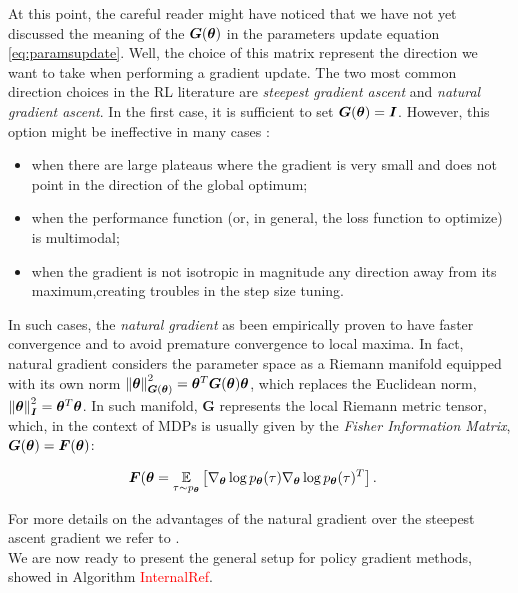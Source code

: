 At this point, the careful reader might have noticed that we have not yet discussed the meaning of the $\boldsymbol{G}(\boldsymbol{\theta})$ in the parameters update equation \ref{eq:paramsupdate}. Well, the choice of this matrix represent the direction we want to take when performing a gradient update. The two most common direction choices in the \gls{RL} literature are \emph{steepest gradient ascent} and \emph{natural gradient ascent}. In the first case, it is sufficient to set $\boldsymbol{G}(\boldsymbol{\theta})=\boldsymbol{I}$. However, this option might be ineffective in many cases \cite{amari1998natural1}:

\begin{itemize}
\item when there are large plateaus where the gradient is very small and does not point in the direction of the global optimum;
\item when the performance function (or, in general, the loss function to optimize) is multimodal;
\item when the gradient is not isotropic in magnitude \wrt any direction away from its maximum,creating troubles in the step size tuning.
\end{itemize}

In such cases, the \emph{natural gradient} as been empirically proven to have faster convergence and to avoid premature convergence to local maxima. In fact, natural gradient considers the parameter space as a Riemann manifold equipped with its own norm $\left\lVert\boldsymbol{\theta}\right\rVert^2_{\boldsymbol{G}(\boldsymbol{\theta})}=\boldsymbol{\theta}^T\boldsymbol{G}(\boldsymbol{\theta})\boldsymbol{\theta}$, which replaces the Euclidean norm, $\left\lVert\boldsymbol{\theta}\right\rVert^2_{\boldsymbol{I}}=\boldsymbol{\theta}^T\boldsymbol{\theta}$. In such manifold, $\boldsymbol{G}$ represents the local Riemann metric tensor, which, in the context of \gls{MDP}s is usually given by the \emph{Fisher Information Matrix}, \ie $\boldsymbol{G}(\boldsymbol{\theta})=\boldsymbol{F}(\boldsymbol{\theta})$:

\begin{align}
\boldsymbol{F}(\boldsymbol{\theta} &= \underset{\tau\sim p_{\boldsymbol{\theta}}}{\mathbb{E}}\left[{\nabla_{\boldsymbol{\theta}}\log p_{\boldsymbol{\theta}}(\tau)\nabla_{\boldsymbol{\theta}}\log p_{\boldsymbol{\theta}}(\tau)^T}\right].
\end{align}

For more details on the advantages of the natural gradient over the steepest ascent gradient we refer to \cite{amari1998natural1, amari1998natural2, peters2008reinforcement}. \\
We are now ready to present the general setup for policy gradient methods, showed in Algorithm \textcolor{red}{InternalRef}.


